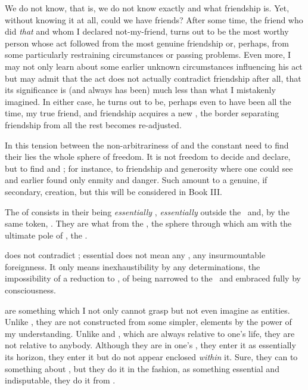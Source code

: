 We do not know, that is, we do not know exactly and  what
friendship is. Yet, without knowing it at all, could we have friends?  After some
time, the friend who did {\em that} and whom I declared not-my-friend, turns out
to be the most worthy person whose act followed from the most genuine friendship
or, perhaps, from some particularly restraining circumstances or passing
problems. Even more, I may not only learn about some earlier unknown
circumstances influencing his act but may admit that the act does not actually
contradict friendship after all, that its significance is (and always has
been) much less than what I mistakenly imagined. In either case, he
turns out to be, perhaps even to have been all the time, my true friend, and
friendship acquires a new , the border separating friendship from
all the rest becomes re-adjusted.

In this tension between the non-arbitrariness of  and the
constant need to find their  lies the whole sphere of
 freedom. It is not freedom to decide and declare, but to find and
; for instance, to  friendship and generosity where one
could see and earlier found only enmity and danger. Such 
amount to a genuine, if secondary, creation, but this will be considered in Book
III. 


The  of  consists in
their being {\em essentially} , {\em essentially} outside the
\hoa\ and, by the same token, .  They are what 
 from the , the sphere through which  am 
with the ultimate pole of , the .

\pa
{} does not contradict ; essential
 does not mean any , any insurmountable
foreignness. It only means inexhaustibility by any  determinations,
the impossibility of a reduction to , of being narrowed to the
\hoa\ and embraced fully by  consciousness.

 are something which I not only cannot grasp but not even imagine
as entities.  Unlike , they are not constructed from some simpler,
 elements by the power of my understanding.  Unlike  and , which are always relative to one's life,
they are not relative to anybody. Although they are  in one's
, they enter it as essentially  its horizon,
they enter it but do not appear enclosed {\em within} it.  Sure, they can
 to  something about , but they do it in the
 fashion, as something essential and indisputable, they do it from
.

